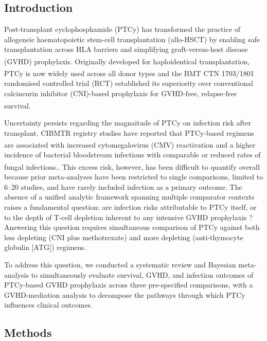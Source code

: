 \documentclass[
  british,
  8.6pt,
  a4paper,
  twocolumn]{article}
\begin{document}
\subsection{Introduction}\label{introduction}

Post-transplant cyclophosphamide (PTCy) has transformed the practice of
allogeneic haematopoietic stem-cell transplantation (allo-HSCT) by
enabling safe transplantation across HLA barriers and simplifying
graft-versus-host disease (GVHD)
prophylaxis.\textsuperscript{} Originally
developed for haploidentical
transplantation\textsuperscript{}, PTCy is
now widely used across all donor
types\textsuperscript{} and the BMT CTN
1703/1801 randomised controlled trial (RCT) established its superiority
over conventional calcineurin inhibitor (CNI)-based prophylaxis for
GVHD-free, relapse-free
survival.\textsuperscript{}

Uncertainty persists regarding the magnaitude of PTCy on infection risk
after transplant. CIBMTR registry studies have reported that PTCy-based
regimens are associated with increased cytomegalovirus (CMV)
reactivation\textsuperscript{} and a
higher incidence of bacterial bloodstream infections with comparable or
reduced rates of fungal
infections.\textsuperscript{}. This
excess risk, however, has been difficult to quantify overall because
prior meta-analyses have been restricted to single comparisons, limited
to 6--20 studies, and have rarely included infection as a primary
outcome. The absence of a unified analytic framework spanning multiple
comparator contexts raises a fundamental question: are infection risks
attributable to PTCy itself, or to the depth of T-cell depletion
inherent to any intensive GVHD prophylaxis ? Answering this question
requires simultaneous comparison of PTCy against both less depleting
(CNI plus methotrexate) and more depleting (anti-thymocyte globulin
{[}ATG{]}) regimens.

To address this question, we conducted a systematic review and Bayesian
meta-analysis to simultaneously evaluate survival, GVHD, and infection
outcomes of PTCy-based GVHD prophylaxis across three pre-specified
comparisons, with a GVHD-mediation analysis to decompose the pathways
through which PTCy influences clinical outcomes.

\subsection{Methods}\label{methods}
\end{document}
